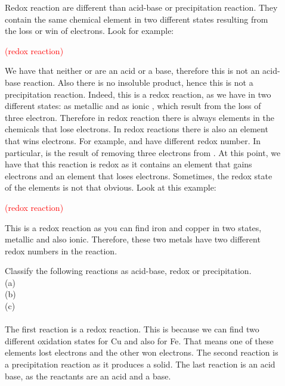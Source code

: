 \documentclass[main.tex]{subfiles} %
\begin{document}
\begin{description}
\item[] Redox reaction are different than acid-base or precipitation reaction. They contain the same chemical element in two different states resulting from the loss or win of electrons. Look for example:
\begin{center}\textcolor{red}{ (redox reaction) }\end{center}
We have that neither  or  are an acid or a base, therefore this is not an acid-base reaction. Also there is no insoluble product, hence this is not a precipitation reaction. Indeed, this is a redox reaction, as we have  in two different states: as metallic  and as ionic  , which result from the loss of three electron. Therefore in redox reaction there is always elements in the chemicals that lose electrons. In redox reactions there is also an element that wins electrons. For example,  and  have different redox number. In particular,  is the result of removing three electrons from . At this point, we have that this reaction is redox as it contains an element that gains electrons and an element that loses electrons. Sometimes, the redox state of the elements is not that obvious. Look at this example:
\begin{center}\textcolor{red}{ (redox reaction) }\end{center}
This is a redox reaction as you can find iron and copper in two states, metallic and also ionic. Therefore, these two metals have two different redox numbers in the reaction.
\begin{example} %
Classify the following reactions as acid-base, redox or precipitation.\\
(a)  \\
(b)   \\
(c)  \\
\\
The first reaction is a redox reaction. This is because we can find two different oxidation states for Cu and also for Fe. That means one of these elements lost electrons and the other won electrons. The second reaction is a precipitation reaction as it produces a solid. The last reaction is an acid base, as the reactants are an acid and a base.\\

\end{example}
\end{description}
\end{document}
